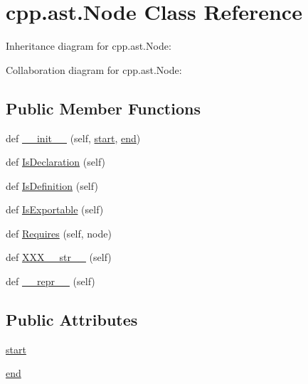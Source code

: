 \hypertarget{classcpp_1_1ast_1_1_node}{}\section{cpp.\+ast.\+Node Class Reference}
\label{classcpp_1_1ast_1_1_node}


Inheritance diagram for cpp.\+ast.\+Node\+:


Collaboration diagram for cpp.\+ast.\+Node\+:
\subsection*{Public Member Functions}
\begin{DoxyCompactItemize}
\item 
def \hyperlink{classcpp_1_1ast_1_1_node_a2cbd6969346645259afc3be51faae904}{\+\_\+\+\_\+init\+\_\+\+\_\+} (self, \hyperlink{classcpp_1_1ast_1_1_node_a7b2aa97e6a049bb1a93aea48c48f1f44}{start}, \hyperlink{classcpp_1_1ast_1_1_node_a3c5e5246ccf619df28eca02e29d69647}{end})
\item 
def \hyperlink{classcpp_1_1ast_1_1_node_ab3eca703a79fb65bc25dfbcb7547c79e}{Is\+Declaration} (self)
\item 
def \hyperlink{classcpp_1_1ast_1_1_node_a684ee9a357168e7e07a24fc6812f66e6}{Is\+Definition} (self)
\item 
def \hyperlink{classcpp_1_1ast_1_1_node_a313273874ccf578485006d4000128234}{Is\+Exportable} (self)
\item 
def \hyperlink{classcpp_1_1ast_1_1_node_a31ae211f954a8c578ef16226df5ac8c8}{Requires} (self, node)
\item 
def \hyperlink{classcpp_1_1ast_1_1_node_ab5dfeabcbcd7c1f5feb8522edffb8b4a}{X\+X\+X\+\_\+\+\_\+str\+\_\+\+\_\+} (self)
\item 
def \hyperlink{classcpp_1_1ast_1_1_node_ab89915656a60c7b7c752e5baa607c532}{\+\_\+\+\_\+repr\+\_\+\+\_\+} (self)
\end{DoxyCompactItemize}
\subsection*{Public Attributes}
\begin{DoxyCompactItemize}
\item 
\hyperlink{classcpp_1_1ast_1_1_node_a7b2aa97e6a049bb1a93aea48c48f1f44}{start}
\item 
\hyperlink{classcpp_1_1ast_1_1_node_a3c5e5246ccf619df28eca02e29d69647}{end}
\end{DoxyCompactItemize}


